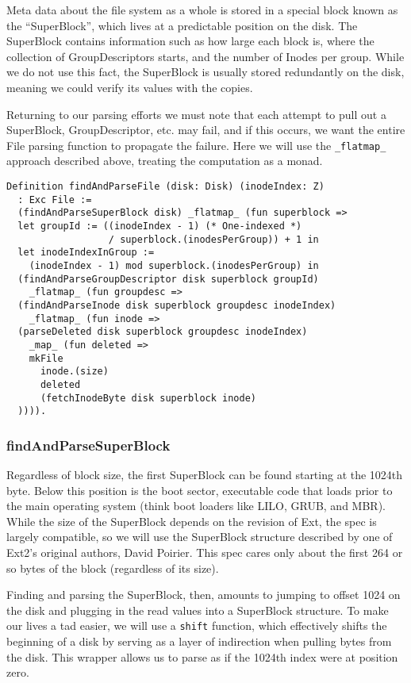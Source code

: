\documentclass[nocopyrightspace]{sigplanconf}
\begin{document}
Meta data about the file system as a whole is stored in a special block known
as the ``SuperBlock'', which lives at a predictable position on the disk. The
SuperBlock contains information such as how large each block is, where the
collection of GroupDescriptors starts, and the number of Inodes per group.
While we do not use this fact, the SuperBlock is usually stored redundantly on
the disk, meaning we could verify its values with the copies.

Returning to our parsing efforts we must note that each attempt to pull out a
SuperBlock, GroupDescriptor, etc. may fail, and if this occurs, we want the
entire File parsing function to propagate the failure. Here we will use the
{\tt \_flatmap\_} approach described above, treating the computation as a
monad.

\begin{lstlisting}
Definition findAndParseFile (disk: Disk) (inodeIndex: Z) 
  : Exc File :=
  (findAndParseSuperBlock disk) _flatmap_ (fun superblock =>
  let groupId := ((inodeIndex - 1) (* One-indexed *)
                  / superblock.(inodesPerGroup)) + 1 in
  let inodeIndexInGroup := 
    (inodeIndex - 1) mod superblock.(inodesPerGroup) in
  (findAndParseGroupDescriptor disk superblock groupId) 
    _flatmap_ (fun groupdesc =>
  (findAndParseInode disk superblock groupdesc inodeIndex) 
    _flatmap_ (fun inode =>
  (parseDeleted disk superblock groupdesc inodeIndex) 
    _map_ (fun deleted =>
    mkFile
      inode.(size)
      deleted
      (fetchInodeByte disk superblock inode)
  )))).
\end{lstlisting}

\subsubsection{findAndParseSuperBlock}

Regardless of block size, the first SuperBlock can be found starting at the
1024th byte. Below this position is the boot sector, executable code that
loads prior to the main operating system (think boot loaders like LILO, GRUB,
and MBR). While the size of the SuperBlock depends on the revision of Ext, the
spec is largely compatible, so we will use the SuperBlock structure described
by one of Ext2's original authors, David Poirier\cite{non-gnu}. This spec
cares only about the first 264 or so bytes of the block (regardless of its
size).

Finding and parsing the SuperBlock, then, amounts to jumping to offset 1024 on
the disk and plugging in the read values into a SuperBlock structure. To make
our lives a tad easier, we will use a {\tt shift} function, which effectively
shifts the beginning of a disk by serving as a layer of indirection when
pulling bytes from the disk. This wrapper allows us to parse as if the 1024th
index were at position zero.
\end{document}

